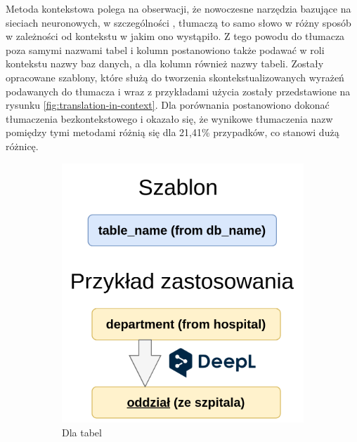 Metoda kontekstowa polega na obserwacji, że nowoczesne narzędzia bazujące na sieciach neuronowych, w szczególności , tłumaczą to samo słowo w różny sposób w zależności od kontekstu w jakim ono wystąpiło. Z tego powodu do tłumacza poza samymi nazwami tabel i kolumn postanowiono także podawać w roli kontekstu nazwy baz danych, a dla kolumn również nazwy tabeli. Zostały opracowane szablony, które służą do tworzenia skontekstualizowanych wyrażeń podawanych do tłumacza i wraz z przykładami użycia zostały przedstawione na rysunku \ref{fig:translation-in-context}. Dla porównania postanowiono dokonać tłumaczenia bezkontekstowego i okazało się, że wynikowe tłumaczenia nazw pomiędzy tymi metodami różnią się dla 21,41\% przypadków, co stanowi dużą różnicę.

\begin{figure}[ht!]
\centering
\begin{subfigure}{0.4\textwidth}
    \includegraphics[width=\textwidth]{images/translation_in_context_table.png}
    \caption{Dla tabel}
    \label{fig:first}
\end{subfigure}
\hfill
\begin{subfigure}{0.50\textwidth}

\end{subfigure}
\end{figure}

